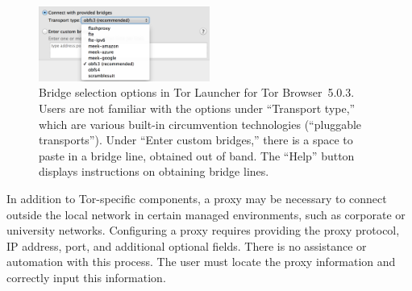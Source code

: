 \documentclass[USenglish,oneside,twocolumn]{article}
\begin{document}
\begin{figure}
  \centering
    \includegraphics[width=0.5\textwidth]{bridge-options.png}
\caption{
Bridge selection options in Tor Launcher for Tor Browser~5.0.3.
Users are not familiar with the options under ``Transport type,'' which are various
built-in circumvention technologies (``pluggable transports'').
Under ``Enter custom bridges,'' there is a space to paste in
a bridge line, obtained out of band.
The ``Help'' button displays instructions on obtaining
bridge lines. 
}
\label{fig:bridge-options}
\end{figure}

In addition to Tor-specific components, a proxy may be necessary to connect 
outside the local network in certain managed environments, such as corporate or university networks.
Configuring a proxy requires providing the proxy protocol, IP address, port, and additional optional
fields. There is no assistance or automation with this process. The user must locate the 
proxy information and correctly input this information. 
  
\end{document}
